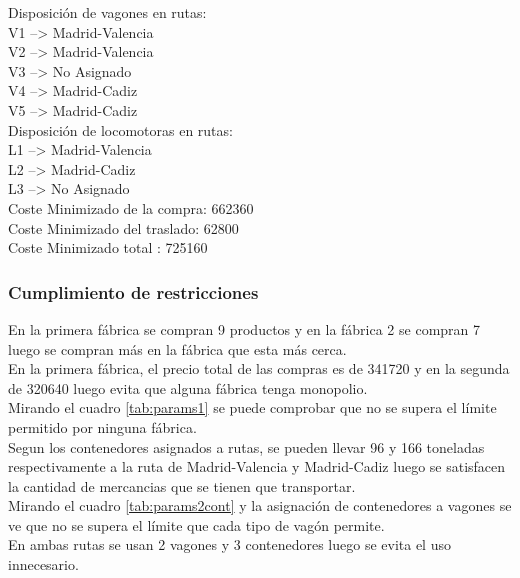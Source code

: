 \documentclass[11pt,spanish]{article}
\begin{document}
\begin{tabbing}
		Disposición de vagones en rutas:\\
		\>	V1 --> Madrid-Valencia\\
		\>	V2 --> Madrid-Valencia\\
		\>	V3 --> No Asignado\\
		\>	V4 --> Madrid-Cadiz\\
		\>	V5 --> Madrid-Cadiz\\
		Disposición de locomotoras en rutas:\\
		\>	L1 --> Madrid-Valencia\\
		\>	L2 --> Madrid-Cadiz\\
		\>	L3 --> No Asignado\\
		Coste Minimizado de la compra: 662360\\
		Coste Minimizado del traslado: 62800\\
		Coste Minimizado total       : 725160\\
		\end{tabbing}
			\subsubsection{Cumplimiento de restricciones}
			En la primera fábrica se compran 9 productos y en la fábrica 2 se compran 7 luego se compran más en la fábrica que esta más cerca.\\
			En la primera fábrica, el precio total de las compras es de 341720 y en la segunda de 320640 luego evita que alguna fábrica tenga monopolio.\\
			Mirando el cuadro \ref{tab:params1} se puede comprobar que no se supera el límite permitido por ninguna fábrica.\\
			Segun los contenedores asignados a rutas, se pueden llevar 96 y 166 toneladas respectivamente a la ruta de Madrid-Valencia y Madrid-Cadiz luego se satisfacen la cantidad de mercancias que se tienen que transportar.\\
			Mirando el cuadro \ref{tab:params2cont} y la asignación de contenedores a vagones se ve que no se supera el límite que cada tipo de vagón permite.\\
			En ambas rutas se usan 2 vagones y 3 contenedores luego se evita el uso innecesario.
\end{document}
